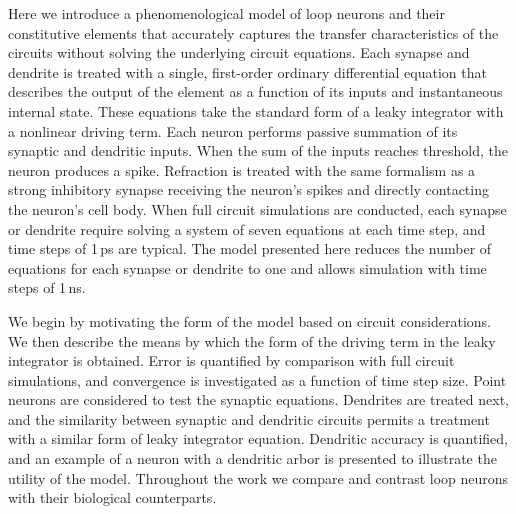 \documentclass[twocolumn]{article}
\begin{document}
Here we introduce a phenomenological model of loop neurons and their constitutive elements that accurately captures the transfer characteristics of the circuits without solving the underlying circuit equations. Each synapse and dendrite is treated with a single, first-order ordinary differential equation that describes the output of the element as a function of its inputs and instantaneous internal state. These equations take the standard form of a leaky integrator with a nonlinear driving term. Each neuron performs passive summation of its synaptic and dendritic inputs. When the sum of the inputs reaches threshold, the neuron produces a spike. Refraction is treated with the same formalism as a strong inhibitory synapse receiving the neuron's spikes and directly contacting the neuron's cell body. When full circuit simulations are conducted, each synapse or dendrite require solving a system of seven equations at each time step, and time steps of 1\,ps are typical. The model presented here reduces the number of equations for each synapse or dendrite to one and allows simulation with time steps of 1\,ns. 

We begin by motivating the form of the model based on circuit considerations. We then describe the means by which the form of the driving term in the leaky integrator is obtained. Error is quantified by comparison with full circuit simulations, and convergence is investigated as a function of time step size. Point neurons are considered to test the synaptic equations. Dendrites are treated next, and the similarity between synaptic and dendritic circuits permits a treatment with a similar form of leaky integrator equation. Dendritic accuracy is quantified, and an example of a neuron with a dendritic arbor is presented to illustrate the utility of the model. Throughout the work we compare and contrast loop neurons with their biological counterparts. 
\end{document}

